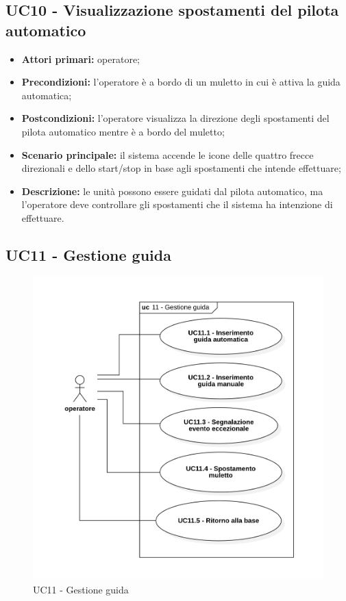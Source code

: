 \subsection{UC10 - Visualizzazione spostamenti del pilota automatico}
\begin{itemize}
	\item 	\textbf{Attori primari:} operatore;
	\item 	\textbf{Precondizioni:} l’operatore è a bordo di un muletto in cui è attiva la guida automatica;
	\item 	\textbf{Postcondizioni:} l’operatore visualizza la direzione degli spostamenti del pilota automatico mentre è a bordo del muletto;
	\item 	\textbf{Scenario principale:} il sistema accende le icone delle quattro frecce direzionali e dello start/stop in base agli spostamenti che intende effettuare;
	\item 	\textbf{Descrizione:} le unità possono essere guidati dal pilota automatico, ma l’operatore deve controllare gli spostamenti che il sistema ha intenzione di effettuare.

\end{itemize}
 
\subsection{UC11 - Gestione guida}

\begin{figure}[H]
	\centering
	\includegraphics[scale=0.52]{res/images/uc11.png}
	\caption{ UC11 - Gestione guida}
\end{figure}

